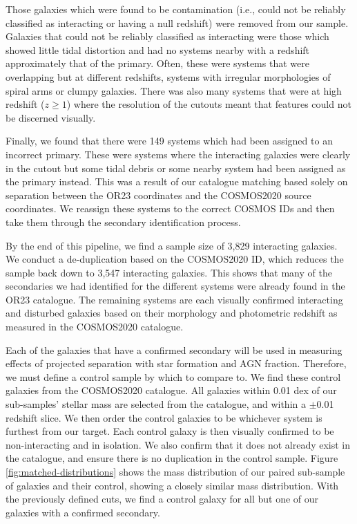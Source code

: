 \documentclass[fleqn,usenatbib]{mnras}
\begin{document}
Those galaxies which were found to be contamination (i.e., could not be reliably classified as interacting or having a null redshift) were removed from our sample. Galaxies that could not be reliably classified as interacting were those which showed little tidal distortion and had no systems nearby with a redshift approximately that of the primary. Often, these were systems that were overlapping but at different redshifts, systems with irregular morphologies of spiral arms or clumpy galaxies. There was also many systems that were at high redshift ($z \geq 1$) where the resolution of the cutouts meant that features could not be discerned visually.

Finally, we found that there were 149 systems which had been assigned to an incorrect primary. These were systems where the interacting galaxies were clearly in the cutout but some tidal debris or some nearby system had been assigned as the primary instead. This was a result of our catalogue matching based solely on separation between the OR23 coordinates and the COSMOS2020 source coordinates. We reassign these systems to the correct COSMOS IDs and then take them through the secondary identification process.

By the end of this pipeline, we find a sample size of 3,829 interacting galaxies. We conduct a de-duplication based on the COSMOS2020 ID, which reduces the sample back down to 3,547 interacting galaxies. This shows that many of the secondaries we had identified for the different systems were already found in the OR23 catalogue. The remaining systems are each visually confirmed interacting and disturbed galaxies based on their morphology and photometric redshift as measured in the COSMOS2020 catalogue.

Each of the galaxies that have a confirmed secondary will be used in measuring effects of projected separation with star formation and AGN fraction. Therefore, we must define a control sample by which to compare to. We find these control galaxies from the COSMOS2020 catalogue. All galaxies within 0.01 dex of our sub-samples' stellar mass are selected from the catalogue, and within a $\pm$0.01 redshift slice. We then order the control galaxies to be whichever system is furthest from our target. Each control galaxy is then visually confirmed to be non-interacting and in isolation. We also confirm that it does not already exist in the catalogue, and ensure there is no duplication in the control sample. Figure \ref{fig:matched-distributions} shows the mass distribution of our paired sub-sample of galaxies and their control, showing a closely similar mass distribution. With the previously defined cuts, we find a control galaxy for all but one of our galaxies with a confirmed secondary.
\end{document}
